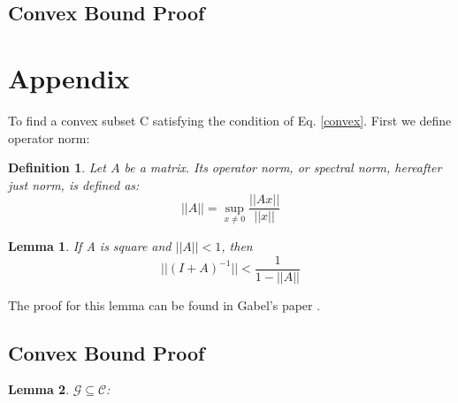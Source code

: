 \documentclass[11pt,twocolumn,varwidth=true,a4paper,fleqn]{article}
\newtheorem{lemma}{Lemma}
\newtheorem{definition}{Definition}
\begin{document}
\subsection{Convex Bound Proof}





\clearpage
\appendix
\section{Appendix} \label{AppendixA}
To find a convex subset C satisfying the condition of Eq. \ref{convex}. 
First we define operator norm:
\begin{definition}
Let $A$ be a matrix. Its operator norm, or
spectral norm, hereafter just norm, is defined as:
\begin{equation*}
||A|| = \sup_{x \neq 0}\frac{||Ax||}{||x||} 
\end{equation*}
\end{definition}

\begin{lemma} \label{lemma:newman}
If A is square and $||A|| < 1$, then
\begin{equation*}
||(I+A)^{-1}|| < \frac{1}{1-||A||}
\end{equation*}
\end{lemma}
The proof for this lemma can be found in Gabel's paper
\cite{gabel2015monitoring}.

\subsection{Convex Bound Proof}
\begin{lemma}
$\mathcal{G} \subseteq \mathcal{C}$:
\end{lemma}
\end{document}
